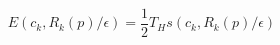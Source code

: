 \begin{equation}\label{3.9}
E(c_k,R_k(p)/\epsilon)=\frac 12 T_H s(c_k,R_k(p)/\epsilon)~~
\end{equation}

